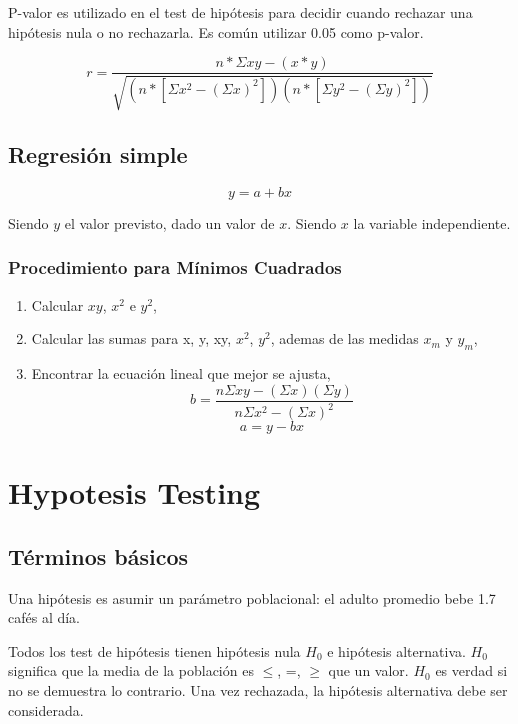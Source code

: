 \documentclass[oneside]{book}
\begin{document}
P-valor es utilizado en el test de hipótesis para decidir cuando rechazar una hipótesis nula o no rechazarla. Es común utilizar 0.05 como p-valor. 

\begin{equation}
r = \frac{n*\Sigma xy - (x*y)}{\sqrt{(n*[\Sigma x^2- (\Sigma x)^2])(n*[\Sigma y^2- (\Sigma y)^2])}}
\end{equation}

\section{Regresión simple}

\begin{equation}
y = a + bx
\end{equation}

Siendo $y$ el valor previsto, dado un valor de $x$. Siendo $x$ la variable independiente.

\subsection{Procedimiento para Mínimos Cuadrados}

\begin{enumerate}
	\item Calcular $xy$, $x^2$ e $y^2$,
	\item Calcular las sumas para x, y, xy, $x^2$, $y^2$, ademas de las medidas $x_m$ y $y_m$,
	\item Encontrar la ecuación lineal que mejor se ajusta,
	\begin{equation}
	b = \frac{n \Sigma xy - (\Sigma x)(\Sigma y)}{n \Sigma x^2 - (\Sigma x)^2}
	\end{equation}
	\begin{equation}
		a = y - bx 
	\end{equation}
\end{enumerate}

\chapter{Hypotesis Testing}

\section{Términos básicos}

Una hipótesis es asumir un parámetro poblacional: el adulto promedio bebe 1.7 cafés al día.

Todos los test de hipótesis tienen hipótesis nula $H_0$ e hipótesis alternativa. $H_0$ significa que la media de la población es $\leq$, =, $\geq$ que un valor. $H_0$ es verdad si no se demuestra lo contrario. Una vez rechazada, la hipótesis alternativa debe ser considerada.
\end{document}

